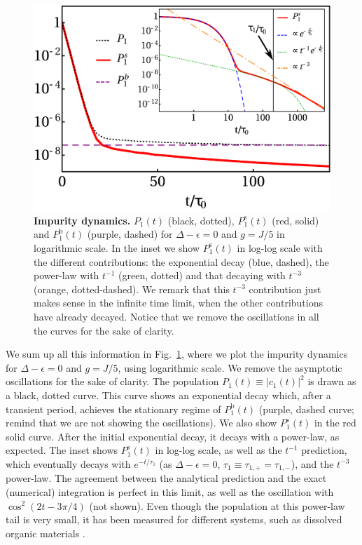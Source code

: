 \documentclass[aps,pra,twocolumn,floatfix,superscriptaddress]{revtex4-1}%
\begin{document}
\begin{figure}[thb!]
\includegraphics[width=1.0\columnwidth]{P_Delta_0_g_0_2.pdf}
\caption{{\bf Impurity dynamics.} $P_1(t)$ (black, dotted), $P_1^\text{s}(t)$ (red, solid) and $P_1^\text{b}(t)$ (purple, dashed) for $\Delta-\epsilon=0$ and $g=J/5$ in logarithmic scale. In the inset we show $P_1^\text{s}(t)$ in log-log scale with the different contributions: the exponential decay (blue, dashed), the power-law with $t^{-1}$ (green, dotted) and that decaying with $t^{-3}$ (orange, dotted-dashed). We remark that this $t^{-3}$ contribution just makes sense in the infinite time limit, when the other contributions have already decayed. Notice that we remove the oscillations in all the curves for the sake of clarity.}\label{fig:qubit_dynamics}
\end{figure}

We sum up all this information in Fig.\ \ref{fig:qubit_dynamics}, where we plot the impurity dynamics for $\Delta-\epsilon=0$ and $g=J/5$, using logarithmic scale. 
We remove the asymptotic oscillations for the sake of clarity. The population $P_1(t)\equiv|c_1(t)|^2$ is drawn as a black, dotted curve. This curve shows an exponential decay which, after a transient period, achieves the stationary regime of $P_1^\text{b}(t)$ (purple, dashed curve; remind that we are not showing the oscillations). We also show $P_1^\text{s}(t)$ in the red solid curve. After the initial exponential decay, it decays with a power-law, as expected. The inset shows $P_1^\text{s}(t)$ in log-log scale, as well as the $t^{-1}$ prediction, which eventually decays with $e^{-t/\tau_1}$ (as $\Delta-\epsilon=0$, $\tau_1\equiv\tau_{1,+}=\tau_{1,-}$), and the $t^{-3}$ power-law. The agreement between the analytical prediction and the exact (numerical) integration is perfect in this limit, as well as the oscillation with $\cos^2(2t-3\pi/4)$ (not shown). Even though the population at this power-law tail is very small, it has been measured for different systems, such as dissolved organic materials \cite{Rothe2006}.
\end{document}
